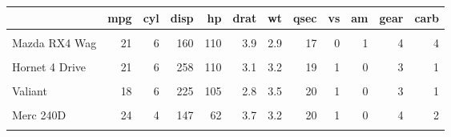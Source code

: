 \documentclass{article}
\begin{document}
\thispagestyle{empty}

\begin{table}
\centering
\begin{tabular}{lrrrrrrrrrrr}
\toprule
\textbf{ } & \textbf{mpg} & \textbf{cyl} & \textbf{disp} & \textbf{hp} & \textbf{drat} & \textbf{wt} & \textbf{qsec} & \textbf{vs} & \textbf{am} & \textbf{gear} & \textbf{carb}\\
\midrule
\cellcolor{blue!10}{Mazda RX4} & \cellcolor{blue!10}{21} & \cellcolor{blue!10}{6} & \cellcolor{blue!10}{160} & \cellcolor{blue!10}{110} & \cellcolor{blue!10}{3.9} & \cellcolor{blue!10}{2.6} & \cellcolor{blue!10}{16} & \cellcolor{blue!10}{0} & \cellcolor{blue!10}{1} & \cellcolor{blue!10}{4} & \cellcolor{blue!10}{4}\\
Mazda RX4 Wag & 21 & 6 & 160 & 110 & 3.9 & 2.9 & 17 & 0 & 1 & 4 & 4\\
\cellcolor{blue!10}{Datsun 710} & \cellcolor{blue!10}{23} & \cellcolor{blue!10}{4} & \cellcolor{blue!10}{108} & \cellcolor{blue!10}{93} & \cellcolor{blue!10}{3.9} & \cellcolor{blue!10}{2.3} & \cellcolor{blue!10}{19} & \cellcolor{blue!10}{1} & \cellcolor{blue!10}{1} & \cellcolor{blue!10}{4} & \cellcolor{blue!10}{1}\\
Hornet 4 Drive & 21 & 6 & 258 & 110 & 3.1 & 3.2 & 19 & 1 & 0 & 3 & 1\\
\cellcolor{blue!10}{Hornet Sportabout} & \cellcolor{blue!10}{19} & \cellcolor{blue!10}{8} & \cellcolor{blue!10}{360} & \cellcolor{blue!10}{175} & \cellcolor{blue!10}{3.1} & \cellcolor{blue!10}{3.4} & \cellcolor{blue!10}{17} & \cellcolor{blue!10}{0} & \cellcolor{blue!10}{0} & \cellcolor{blue!10}{3} & \cellcolor{blue!10}{2}\\
\addlinespace
Valiant & 18 & 6 & 225 & 105 & 2.8 & 3.5 & 20 & 1 & 0 & 3 & 1\\
\cellcolor{blue!10}{Duster 360} & \cellcolor{blue!10}{14} & \cellcolor{blue!10}{8} & \cellcolor{blue!10}{360} & \cellcolor{blue!10}{245} & \cellcolor{blue!10}{3.2} & \cellcolor{blue!10}{3.6} & \cellcolor{blue!10}{16} & \cellcolor{blue!10}{0} & \cellcolor{blue!10}{0} & \cellcolor{blue!10}{3} & \cellcolor{blue!10}{4}\\
Merc 240D & 24 & 4 & 147 & 62 & 3.7 & 3.2 & 20 & 1 & 0 & 4 & 2\\
\cellcolor{blue!10}{Merc 230} & \cellcolor{blue!10}{23} & \cellcolor{blue!10}{4} & \cellcolor{blue!10}{141} & \cellcolor{blue!10}{95} & \cellcolor{blue!10}{3.9} & \cellcolor{blue!10}{3.1} & \cellcolor{blue!10}{23} & \cellcolor{blue!10}{1} & \cellcolor{blue!10}{0} & \cellcolor{blue!10}{4} & \cellcolor{blue!10}{2}\\

\end{tabular}
\end{table}
\end{document}

